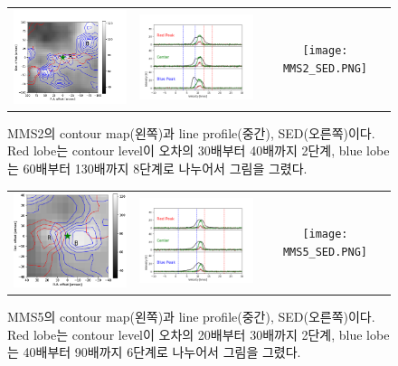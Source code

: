 \begin{figure}[h!]
	\begin{center}
		\begin{tabular}{ccc}
			\includegraphics[width=5cm]{Orion_12CO2-1_MMS2_rbcontour_400_modified.png} &   \includegraphics[width=5cm]{Orion_12CO2-1_MMS2_line_profile_400.png} &
			\texttt{[image: MMS2\_SED.PNG]}\\
		\end{tabular}
		\caption{MMS2의 contour map(왼쪽)과 line profile(중간), SED(오른쪽)이다. Red lobe는 contour level이 오차의 30배부터 40배까지 2단계, blue lobe는 60배부터 130배까지 8단계로 나누어서 그림을 그렸다.}
	\end{center}
\end{figure}

\begin{figure}[h!]
	\begin{center}
		\begin{tabular}{ccc}
			\includegraphics[width=5cm]{Orion_12CO2-1_MMS5_rbcontour_400_modified.png} &   \includegraphics[width=5cm]{Orion_12CO2-1_MMS5_line_profile_400.png} &
			\texttt{[image: MMS5\_SED.PNG]}\\
		\end{tabular}
		\caption{MMS5의 contour map(왼쪽)과 line profile(중간), SED(오른쪽)이다. Red lobe는 contour level이 오차의 20배부터 30배까지 2단계, blue lobe는 40배부터 90배까지 6단계로 나누어서 그림을 그렸다.}
	\end{center}
\end{figure}

